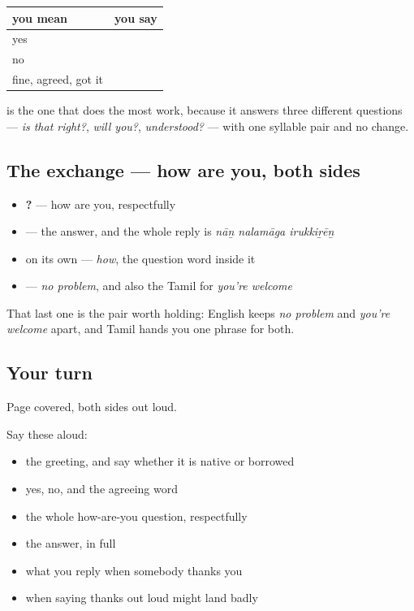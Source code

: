 \begin{grammarlens}[title={Grammar Lens: answering, and how few words it takes}]
\noindent
\begin{tabularx}{\linewidth}{@{}>{\raggedright\arraybackslash}X>{\raggedright\arraybackslash}X@{}}
\toprule
\textbf{you mean} & \textbf{you say} \\
\midrule
yes & \textbf{\ta{ஆம்}} \\
no & \textbf{\ta{இல்லை}} \\
fine, agreed, got it & \textbf{\ta{சரி}} \\
\bottomrule
\end{tabularx}

\textbf{} is the one that does the most work, because it answers three different questions — \emph{is that right?}, \emph{will you?}, \emph{understood?} — with one syllable pair and no change.
\end{grammarlens}

\subsection*{The exchange — how are you, both sides}
\begin{itemize}
\raggedright
  \item \textbf{  ?} — how are you, respectfully
  \item \textbf{} — the answer, and the whole reply is \emph{nāṉ nalamāga irukkiṟēṉ}
  \item \textbf{} on its own — \emph{how}, the question word inside it
  \item \textbf{} — \emph{no problem}, and also the Tamil for \emph{you're welcome}
\end{itemize}

That last one is the pair worth holding: English keeps \emph{no problem} and \emph{you're welcome} apart, and Tamil hands you one phrase for both.

\subsection*{Your turn}
Page covered, both sides out loud.

Say these aloud:

\begin{itemize}
\raggedright
  \item the greeting, and say whether it is native or borrowed
  \item yes, no, and the agreeing word
  \item the whole how-are-you question, respectfully
  \item the answer, in full
  \item what you reply when somebody thanks you
  \item when saying thanks out loud might land badly
\end{itemize}

